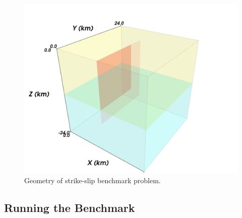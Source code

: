 \noindent \begin{center}
\begin{figure}[H]
\begin{centering}
\includegraphics[scale=0.33]{benchmarks/strikeslip/figs/geometry}
\par\end{centering}

\caption{Geometry of strike-slip benchmark problem.\label{fig:benchmark:strikeslip:geometry}}
\end{figure}

\par\end{center}


\subsection{Running the Benchmark}

